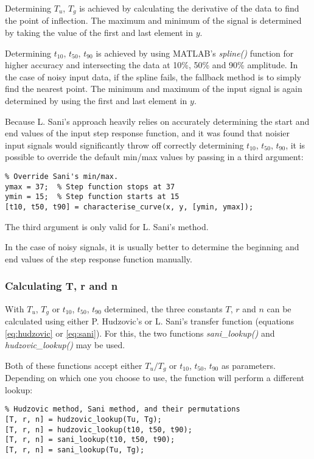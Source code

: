 Determining $T_u$, $T_g$ is achieved by calculating  the  derivative of the data
to  find  the  point  of  inflection.  The maximum and minimum of the signal  is
determined  by  taking  the  value  of  the  first  and  last  element  in  $y$.

Determining   $t_{10}$,  $t_{50}$,  $t_{90}$  is  achieved  by  using   MATLAB's
\textit{spline()}  function for higher accuracy and  intersecting  the  data  at
10\%, 50\% and 90\% amplitude.  In  the  case of noisy input data, if the spline
fails, the fallback method is to simply find the nearest point. The minimum  and
maximum of the  input  signal  is  again  determined by using the first and last
element in $y$.

Because L. Sani's approach heavily relies  on  accurately  determining the start
and  end  values  of  the input step response function, and it  was  found  that
noisier input  signals  would  significantly  throw  off  correctly  determining
$t_{10}$,  $t_{50}$,  $t_{90}$, it is possible to override the  default  min/max
values by passing in a third argument:

\begin{lstlisting}
% Override Sani's min/max.
ymax = 37;  % Step function stops at 37
ymin = 15;  % Step function starts at 15
[t10, t50, t90] = characterise_curve(x, y, [ymin, ymax]);
\end{lstlisting}

The third argument is only valid for L. Sani's method.

In the case  of  noisy  signals, it is usually better to determine the beginning
and end values of the step response function manually.


\subsubsection*{Calculating T, r and n}

With  $T_u$,  $T_g$  or  $t_{10}$,  $t_{50}$,  $t_{90}$  determined,  the  three
constants $T$, $r$ and $n$ can be calculated using  either  P.  Hudzovic's or L.
Sani's  transfer function (equations \ref{eq:hudzovic}  or  \ref{eq:sani}).  For
this, the two functions  \textit{sani\_lookup()} and \textit{hudzovic\_lookup()}
may be used.

Both  of these functions accept either $T_u/T_g$ or $t_{10}$, $t_{50}$, $t_{90}$
as parameters. Depending  on  which  one  you  choose  to use, the function will
perform a different lookup:

\begin{lstlisting}
% Hudzovic method, Sani method, and their permutations
[T, r, n] = hudzovic_lookup(Tu, Tg);
[T, r, n] = hudzovic_lookup(t10, t50, t90);
[T, r, n] = sani_lookup(t10, t50, t90);
[T, r, n] = sani_lookup(Tu, Tg);
\end{lstlisting}

